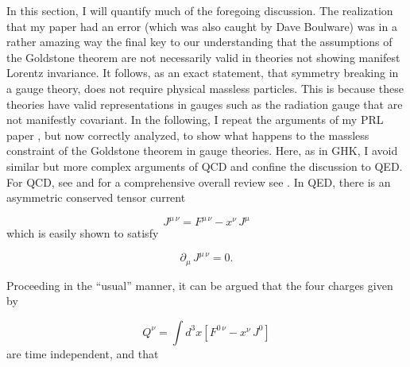 \documentclass[12pt]{article}
\newcommand{\pa}{\partial}
\begin{document}
    In this section, I will quantify much of the foregoing discussion. The
    realization that my paper \cite{ggfu;1964} had an error (which was also
    caught by Dave Boulware) was in a rather amazing way the final key to our
    understanding that the assumptions of the Goldstone theorem are not
    necessarily valid in theories not showing manifest Lorentz invariance. It
    follows, as an exact statement, that symmetry breaking in a gauge theory,
    does not require physical massless particles. This is because these
    theories have valid representations in gauges such as the radiation gauge
    that are not manifestly covariant. In the following, I repeat the
    arguments of my PRL paper \cite{ggfu;1964}, but now correctly analyzed, to
    show what happens to the massless constraint of the Goldstone theorem in
    gauge theories. Here, as in GHK, I avoid similar but more complex
    arguments of QCD and confine the discussion to QED. For QCD, see
    \cite{twbk;1967} and for a comprehensive overall review see
    \cite{ghk;1968}. In QED, there is an asymmetric conserved tensor current



    \begin{equation*}
      J^{\mu\, \nu} = F^{\mu\, \nu} - x^{\nu}\, J^{\mu} \end{equation*}
 which is easily shown to satisfy

     \begin{equation*} \pa_{\mu}\, J^{\mu\, \nu} = 0. \end{equation*}

      Proceeding in the ``usual'' manner, it can be argued that the four charges given by

      \begin{equation*}
      Q^{\nu} = \int d^3x \left[ F^{0\, \nu} - x^{\nu}\, J^0\right]
      \end{equation*}
      are time independent, and that
\end{document}
